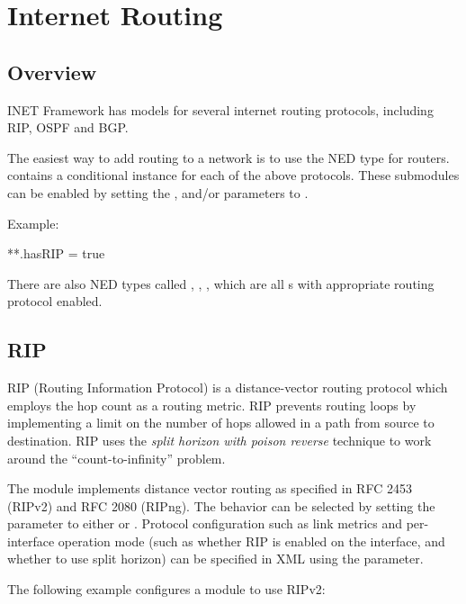 \chapter{Internet Routing}
\label{cha:routing}

\section{Overview}
\label{sec:routing:overview}

INET Framework has models for several internet routing protocols, including
RIP, OSPF and BGP.

The easiest way to add routing to a network is to use the 
NED type for routers.  contains a conditional instance
for each of the above protocols. These submodules can be enabled by
setting the ,  and/or  parameters to
.

Example:

\begin{inifile}
**.hasRIP = true
\end{inifile}

There are also NED types called , ,
, which are all s with appropriate
routing protocol enabled.

\section{RIP}
\label{sec:routing:rip}

RIP (Routing Information Protocol) is a distance-vector routing protocol which
employs the hop count as a routing metric. RIP prevents routing loops by
implementing a limit on the number of hops allowed in a path from source to
destination.  RIP uses the \textit{split horizon with poison reverse} technique
to work around the ``count-to-infinity'' problem.

The  module implements distance vector routing as specified in RFC
2453 (RIPv2) and RFC 2080 (RIPng). The behavior can be selected by setting the
 parameter to either  or . Protocol
configuration such as link metrics and per-interface operation mode (such as 
whether RIP is enabled on the interface, and whether to use split horizon)
can be specified in XML using the  parameter.

The following example configures a  module to use RIPv2:

